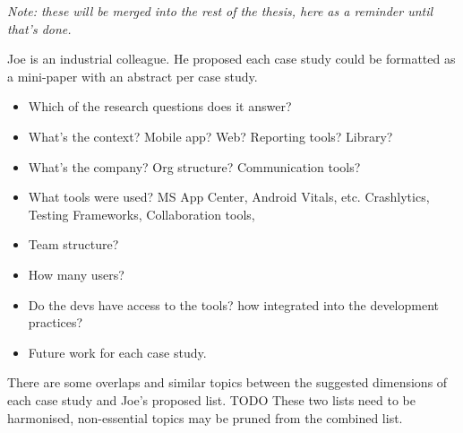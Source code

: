 
\begin{comment}
MUST-DO
The monster table needs a column for what each study contributes to my thesis.
Any other pertinent information to add ?
What viewpoints did each case study provide?
Merge Research Focii and case study objectives vs. the objectives of the case study team.
The long view is useful to highlight of various case studies. Repeated and long-term engagement and access to analytics and/or code.
Mini-table for each case study, include the active study period, follow over ...
The role of the case study.
\end{comment}

\textit{Note: these will be merged into the rest of the thesis, here as a reminder until that's done.}

Joe is an industrial colleague. He proposed each case study could be formatted as a mini-paper with an abstract per case study.
{\small
\begin{itemize}
    \itemsep0em
    \item Which of the research questions does it answer?
    \item What’s the context? Mobile app? Web? Reporting tools? Library?
    \item What’s the company? Org structure? Communication tools?
    \item What tools were used? MS App Center, Android Vitals, etc. Crashlytics, Testing Frameworks, Collaboration tools,
    \item Team structure?
    \item How many users?
    \item Do the devs have access to the tools? how integrated into the development practices?
    \item Future work for each case study.
\end{itemize}
}
There are some overlaps and similar topics between the suggested dimensions of each case study and Joe's proposed list. TODO These two lists need to be harmonised, non-essential topics may be pruned from the combined list.


